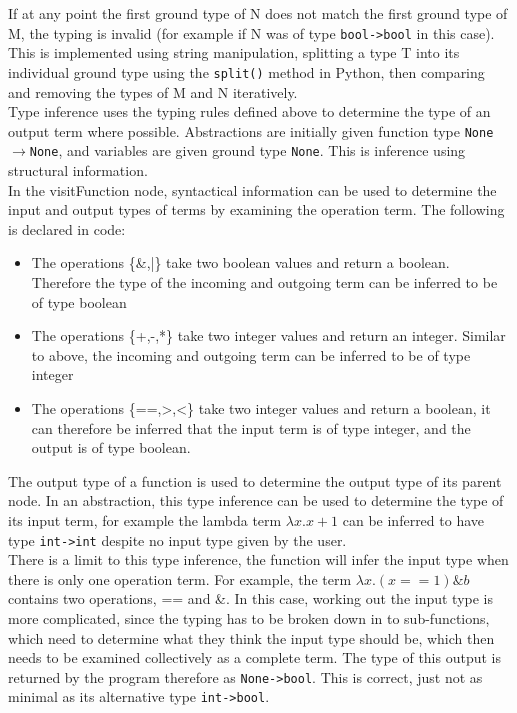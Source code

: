 \documentclass[a4paper,11pt]{report}
\begin{document}
If at any point the first ground type of N does not match the first ground type of M, the typing is invalid (for example if N was of type \texttt{bool->bool} in this case). This is implemented using string manipulation, splitting a type T into its individual ground type using the \texttt{split()} method in Python, then comparing and removing the types of M and N iteratively.\\

Type inference uses the typing rules defined above to determine the type of an output term where possible. Abstractions are initially given function type \texttt{None$\rightarrow$None}, and variables are given ground type \texttt{None}. This is inference using structural information.\\

In the visitFunction node, syntactical information can be used to determine the input and output types of terms by examining the operation term. The following is declared in code:

\begin{itemize}
	\item The operations \{\&,|\} take two boolean values and return a boolean. Therefore the type of the incoming and outgoing term can be inferred to be of type boolean
	\item The operations \{+,-,*\} take two integer values and return an integer. Similar to above, the incoming and outgoing term can be inferred to be of type integer
	\item The operations \{==,>,<\} take two integer values and return a boolean, it can therefore be inferred that the input term is of type integer, and the output is of type boolean. 
\end{itemize}

The output type of a function is used to determine the output type of its parent node. In an abstraction, this type inference can be used to determine the type of its input term, for example the lambda term $\lambda x.x+1$ can be inferred to have type \texttt{int->int} despite no input type given by the user.\\

There is a limit to this type inference, the function will infer the input type when there is only one operation term. For example, the term $\lambda x.(x==1)\&b$ contains two operations, == and \&. In this case, working out the input type is more complicated, since the typing has to be broken down in to sub-functions, which need to determine what they think the input type should be, which then needs to be examined collectively as a complete term. The type of this output is returned by the program therefore as \texttt{None->bool}. This is correct, just not as minimal as its alternative type \texttt{int->bool}.\\
\end{document}

